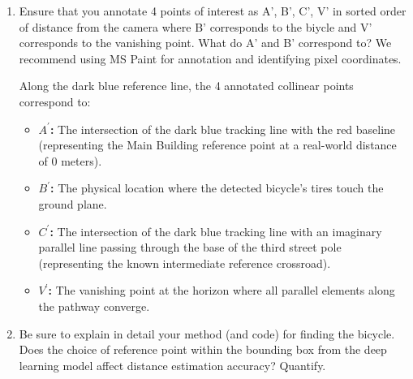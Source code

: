 \begin{enumerate}
\item Ensure that you annotate 4 points of interest as A', B', C', V'  in sorted order of distance from the camera where B' corresponds to the biycle and V' corresponds to the vanishing point.  What do A' and B' correspond to?
We recommend using MS Paint for annotation and identifying pixel coordinates.

\begin{studentSpace}
    Along the dark blue reference line, the 4 annotated collinear points correspond to:
\begin{itemize}
    \item \textbf{$A^{\prime}$:} The intersection of the dark blue tracking line with the red baseline (representing the Main Building reference point at a real-world distance of 0 meters).
    \item \textbf{$B^{\prime}$:} The physical location where the detected bicycle's tires touch the ground plane.
    \item \textbf{$C^{\prime}$:} The intersection of the dark blue tracking line with an imaginary parallel line passing through the base of the third street pole (representing the known intermediate reference crossroad).
    \item \textbf{$V^{\prime}$:} The vanishing point at the horizon where all parallel elements along the pathway converge.
\end{itemize}
\end{studentSpace}

\item Be sure to  explain in detail your method (and code) for finding the bicycle. Does the choice of reference point within the bounding box from the deep learning model affect distance estimation accuracy? Quantify.
\end{enumerate}

